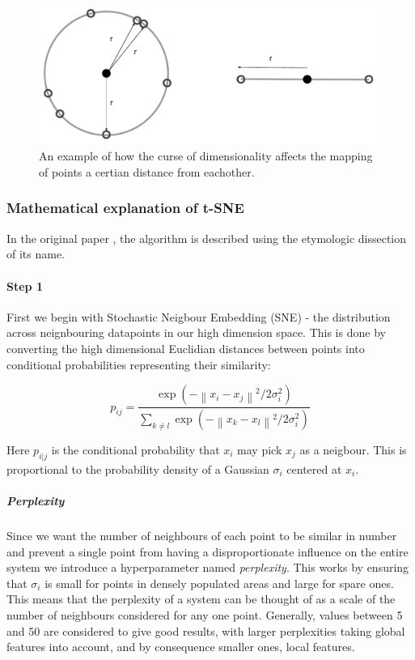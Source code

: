 \begin{figure}[H]
  \centering
\includegraphics[width=.5\textwidth]{4fig/dimcurse.pdf}
\caption{An example of how the curse of dimensionality affects the mapping of points a certian distance from eachother. }\label{fig:dimcurse}
\end{figure}




\subsubsection{Mathematical explanation of t-SNE}

%

In the original paper \citep{tsne}, the algorithm is described using the etymologic dissection of its name.

\paragraph{Step 1}
First we begin with Stochastic Neigbour Embedding (SNE) - the distribution across neignbouring datapoints in our high dimension space. This is done by converting the high dimensional Euclidian distances between points into conditional probabilities representing their similarity:

\begin{equation}
p_{ij} = \frac{\exp(-\left \| x_i - x_j \right \|^2 / 2\sigma_i^2)}{\sum_{k \neq l} \exp(- \left \| x_k - x_l \right \|^2 / 2\sigma_i^2)}
\end{equation}

Here $p_{i|j}$ is the conditional probability that $x_i$ may pick $x_j$ as a neigbour. This is proportional to the probability density of a Gaussian $\sigma_i$ centered at $x_i$.

\subparagraph{Perplexity}
Since we want the number of neighbours of each point to be similar in number and prevent a single point from having a disproportionate influence on the entire system we introduce a hyperparameter named \emph{perplexity}. This works by ensuring that $\sigma_i$ is small for points in densely populated areas and large for spare ones. This means that the perplexity of a system can be thought of as a scale of the number of neighbours considered for any one point. Generally, values between 5 and 50 are considered to give good results, with larger perplexities taking global features into account, and by consequence smaller ones, local features.

